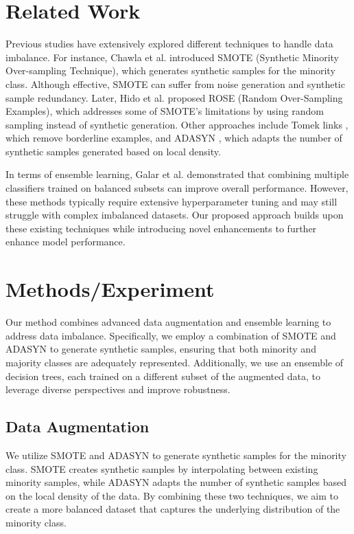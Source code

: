 \section{Related Work}
Previous studies have extensively explored different techniques to handle data imbalance. For instance, Chawla et al. \cite{chawla2002smote} introduced SMOTE (Synthetic Minority Over-sampling Technique), which generates synthetic samples for the minority class. Although effective, SMOTE can suffer from noise generation and synthetic sample redundancy. Later, Hido et al. \cite{hido2008rose} proposed ROSE (Random Over-Sampling Examples), which addresses some of SMOTE's limitations by using random sampling instead of synthetic generation. Other approaches include Tomek links \cite{michalski1974learning}, which remove borderline examples, and ADASYN \cite{wu2004adasyn}, which adapts the number of synthetic samples generated based on local density.

In terms of ensemble learning, Galar et al. \cite{galar2012review} demonstrated that combining multiple classifiers trained on balanced subsets can improve overall performance. However, these methods typically require extensive hyperparameter tuning and may still struggle with complex imbalanced datasets. Our proposed approach builds upon these existing techniques while introducing novel enhancements to further enhance model performance.

\section{Methods/Experiment}
Our method combines advanced data augmentation and ensemble learning to address data imbalance. Specifically, we employ a combination of SMOTE and ADASYN to generate synthetic samples, ensuring that both minority and majority classes are adequately represented. Additionally, we use an ensemble of decision trees, each trained on a different subset of the augmented data, to leverage diverse perspectives and improve robustness.

\subsection{Data Augmentation}
We utilize SMOTE and ADASYN to generate synthetic samples for the minority class. SMOTE creates synthetic samples by interpolating between existing minority samples, while ADASYN adapts the number of synthetic samples based on the local density of the data. By combining these two techniques, we aim to create a more balanced dataset that captures the underlying distribution of the minority class.

